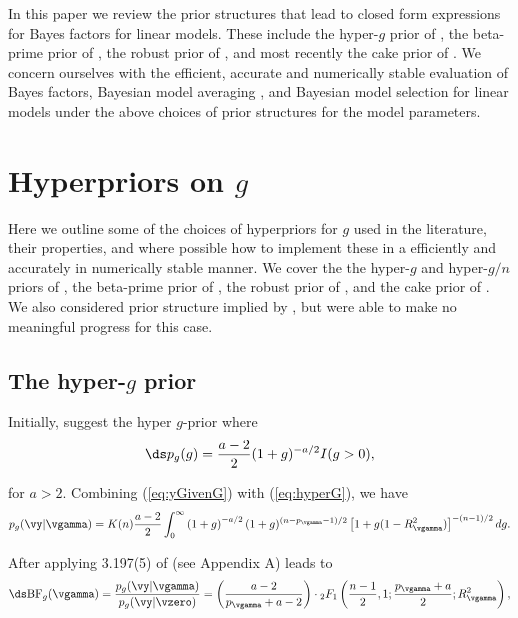 In this paper we review the prior structures that lead to closed form expressions for Bayes factors for linear models.
These include the hyper-$g$ prior of \cite{Liang2008}, the beta-prime prior of \cite{Maruyama2011}, the robust 
prior of \cite{Bayarri2012}, and most recently the cake prior of \cite{OrmerodEtal2017}. We concern ourselves with the efficient, accurate and numerically stable evaluation of Bayes factors, Bayesian model averaging ,
and Bayesian model selection  for linear models 
under the above choices of prior structures for the model parameters.

\section{Hyperpriors on $g$}

Here we outline some of the choices of hyperpriors for $g$ used in the literature, their
properties, and where possible how to implement these in a efficiently and 
accurately in
numerically stable manner. We cover the 
the hyper-$g$ and hyper-$g/n$ priors of \cite{Liang2008}, the beta-prime prior
of \cite{Maruyama2011}, the robust prior of \cite{Bayarri2012}, and the cake
prior of \cite{OrmerodEtal2017}.
We also considered prior structure implied by \cite{Zellner1980}, but were able to make no
meaningful progress for this case.


\subsection{The hyper-$g$ prior}

Initially, \cite{Liang2008} suggest the hyper $g$-prior where
\begin{equation}\label{eq:hyperG}
\ds p_{g}(g) = \frac{a - 2}{2}(1 + g)^{-a/2}I(g>0),
\end{equation}

\noindent for $a>2$. Combining (\ref{eq:yGivenG}) with (\ref{eq:hyperG}), we have
\begin{equation}\label{eq:hyperGmarginalIntegral}
p_{g}(\vy|\vgamma) = K(n) \frac{a - 2}{2}  \int_0^\infty 
\left( 1 + g \right)^{-a/2}
(1 + g)^{(n-p_\vgamma-1)/2} \left[ 1 + g (1 - R_\vgamma^2) \right]^{-(n-1)/2}  dg.
\end{equation}

\noindent After applying 
3.197(5) of \cite{Gradshteyn1988} (see Appendix A) leads to
\begin{equation}\label{eq:hyperGmarginal}
\ds \mbox{BF}_{g}(\vgamma) = \frac{p_{g}(\vy|\vgamma)}{p_{g}(\vy|\vzero)} =  \left( \frac{a - 2}{p_\vgamma + a - 2} \right) \cdot {}_2F_1\left( \frac{n-1}{2}, 1; \frac{p_\vgamma + a}{2}; R_\vgamma^2 \right),
\end{equation}

